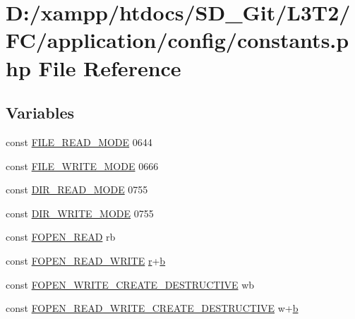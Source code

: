 \hypertarget{application_2config_2constants_8php}{}\section{D\+:/xampp/htdocs/\+S\+D\+\_\+\+Git/\+L3\+T2/\+F\+C/application/config/constants.php File Reference}
\label{application_2config_2constants_8php}
\subsection*{Variables}
\begin{DoxyCompactItemize}
\item 
const \hyperlink{application_2config_2constants_8php_afa80a675a7a8436c2b299e41c63fd405}{F\+I\+L\+E\+\_\+\+R\+E\+A\+D\+\_\+\+M\+O\+D\+E} 0644
\item 
const \hyperlink{application_2config_2constants_8php_a6b9fcdc9259bf9361e8f97e289024242}{F\+I\+L\+E\+\_\+\+W\+R\+I\+T\+E\+\_\+\+M\+O\+D\+E} 0666
\item 
const \hyperlink{application_2config_2constants_8php_a5eb43292f0c56482a7869db8adb1c91d}{D\+I\+R\+\_\+\+R\+E\+A\+D\+\_\+\+M\+O\+D\+E} 0755
\item 
const \hyperlink{application_2config_2constants_8php_aac7345ea170768d48be7cde8ebf6b147}{D\+I\+R\+\_\+\+W\+R\+I\+T\+E\+\_\+\+M\+O\+D\+E} 0755
\item 
const \hyperlink{application_2config_2constants_8php_ab6a0a1c6e9ea5f7625b2dba2f7bd286c}{F\+O\+P\+E\+N\+\_\+\+R\+E\+A\+D} \textquotesingle{}rb\textquotesingle{}
\item 
const \hyperlink{application_2config_2constants_8php_ab98552969950ea978284c998e10d0153}{F\+O\+P\+E\+N\+\_\+\+R\+E\+A\+D\+\_\+\+W\+R\+I\+T\+E} \textquotesingle{}\hyperlink{_admin_2assets_2js_2jquery-1_811_82_8min_8js_a96f65b399314d93896076ceb474b6b9b}{r}+\hyperlink{_admin_2assets_2js_2bootstrap_8min_8js_a398bb8542498d1b14178b02b99df309b}{b}\textquotesingle{}
\item 
const \hyperlink{application_2config_2constants_8php_a246692af603ceac463cab532d81a6048}{F\+O\+P\+E\+N\+\_\+\+W\+R\+I\+T\+E\+\_\+\+C\+R\+E\+A\+T\+E\+\_\+\+D\+E\+S\+T\+R\+U\+C\+T\+I\+V\+E} \textquotesingle{}wb\textquotesingle{}
\item 
const \hyperlink{application_2config_2constants_8php_a1b8581dfce24061e847cc257aed23d62}{F\+O\+P\+E\+N\+\_\+\+R\+E\+A\+D\+\_\+\+W\+R\+I\+T\+E\+\_\+\+C\+R\+E\+A\+T\+E\+\_\+\+D\+E\+S\+T\+R\+U\+C\+T\+I\+V\+E} \textquotesingle{}w+\hyperlink{_admin_2assets_2js_2bootstrap_8min_8js_a398bb8542498d1b14178b02b99df309b}{b}\textquotesingle{}

\end{DoxyCompactItemize}
